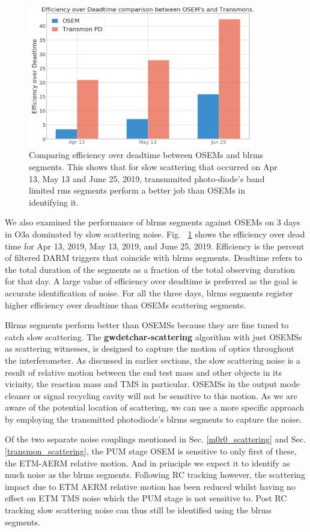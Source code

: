\documentclass[12pt]{iopart}
\begin{document}
\begin{figure}[h]
    \centering
    \includegraphics[width=10cm]{osemtransmon3.png}
    \caption{Comparing efficiency over deadtime between OSEMs and blrms segments. This shows that for slow scattering that occurred on Apr 13, May 13 and June 25, 2019, transmmited photo-diode's band limited rms segments perform a better job than OSEMs in identifying it.}
    \label{fig:osemtrans}
\end{figure}

We also examined the performance of blrms segments against OSEMs on 3 days in O3a dominated by slow scattering noise. Fig. ~\ref{fig:osemtrans} shows the efficiency over dead time for Apr 13, 2019, May 13, 2019, and June 25, 2019. Efficiency is the percent of filtered DARM triggers that coincide with blrms segments. Deadtime refers to the total duration of the segments as a fraction of the total observing duration for that day. A large value of efficiency over deadtime is preferred as the goal is accurate identification of  noise. For all the three days, blrms segments register higher efficiency over deadtime than OSEMs scattering segments.

Blrms segments perform better than OSEMSs because they are fine tuned to catch slow scattering. The \textbf{gwdetchar-scattering} algorithm with just OSEMSs as scattering witnesses, is designed to capture the motion of optics throughout the interferometer. As discussed in earlier sections, the slow scattering noise is a result of relative motion between the end test mass and other objects in its vicinity, the reaction mass and TMS in particular. OSEMSs in the output mode cleaner or signal recycling cavity will not be sensitive to this motion. As we are aware of the potential location of scattering, we can use a more specific approach by employing the transmitted photodiode’s blrms segments to capture the noise. 


Of the two separate noise couplings mentioned in Sec. \ref{m0r0_scattering}  and Sec. \ref{transmon_scattering}, the PUM stage OSEM is sensitive to only first of these, the ETM-AERM relative motion. And in principle we expect it to identify as much noise as the blrms segments. Following RC tracking however, the scattering impact due to ETM AERM relative motion has been reduced whilst having no effect on ETM TMS noise which the PUM stage is not sensitive to. Post RC tracking slow scattering noise can thus still be identified using the blrms segments.
\end{document}
